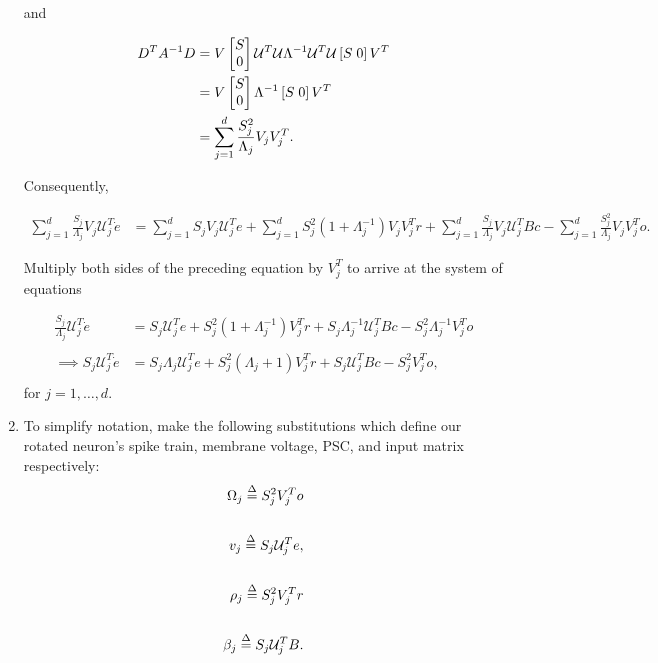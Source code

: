 \begin{enumerate}
and

\begin{align*}
D^{T} A^{-1} D  &= V \begin{bmatrix} S \\ 0\end{bmatrix} \mathcal{U}^T  \mathcal{U} \Lambda^{-1} \mathcal{U}^T \mathcal{U} \left[S \hspace{1mm} 0 \right] V^T \\
  &= V \begin{bmatrix} S \\ 0\end{bmatrix} \Lambda^{-1} \left[S \hspace{1mm} 0 \right] V^T \\
  &= \sum_{j = 1}^{d} \frac{S_j^2}{ \Lambda_j} V_j V_j^T.
\end{align*}

Consequently, 

\begin{align}
    \label{eq:derivation_sub_svd}
    \sum_{j = 1}^{d} \frac{S_j}{ \Lambda_j} V_j \mathcal{U}_j^T \dot{e} &= 
     \sum_{j=1}^d S_j V_j  \mathcal{U}_j^T e
    +
    \sum_{j = 1}^{d} S_j^2 (1 + \Lambda_j^{-1}) V_j V_j^T r
    + 
    \sum_{j = 1}^{d} \frac{S_j}{ \Lambda_j} V_j \mathcal{U}_j^TBc 
    -
    \sum_{j = 1}^{d} \frac{S_j^2}{ \Lambda_j} V_j V_j^T o.
\end{align}


Multiply both sides of the preceding equation by $V_j^T$ to arrive at the system of equations

\begin{align*}
    \frac{S_j}{\Lambda_j} \mathcal{U}_j^T \dot{e} &= 
    S_j \mathcal{U}_j^T e
    +
    S_j^2 (1 + \Lambda_j^{-1})V_j^T r 
    +
    S_j \Lambda_j^{-1} \mathcal{U}_j^T B c
    -
    S_j^2 \Lambda_j^{-1} V_j^T o\\
    \\ \implies 
    S_j \mathcal{U}_j^T \dot{e} &= 
    S_j \Lambda_j \mathcal{U}_j^T e
    +
    S_j^2 (\Lambda_j + 1) V_j^T r 
    +
    S_j \mathcal{U}_j^T B c
    -
    S_j^2 V_j^T o,\\
\end{align*}
for $j = 1, \ldots, d$.

\item To simplify notation, make the following substitutions which define our rotated neuron's spike train, membrane voltage, PSC, and input matrix respectively: 
\begin{align}
    \label{eq:rotated_voltage_psc_def}
    \Omega_j \overset{\Delta}{=} S_j^2 V_j^T o \notag \\  \notag 
    \\  \notag 
    v_j \overset{\Delta}{=} S_j \mathcal{U}_j^T e, \notag  \\
    \\
    \rho_j \overset{\Delta}{=} S_j^2 V_j^T r  \notag \\  \notag 
    \\  \notag 
    \beta_j \overset{\Delta}{=} S_j \mathcal{U}_j^T B. \notag 
\end{align}


\end{enumerate}
